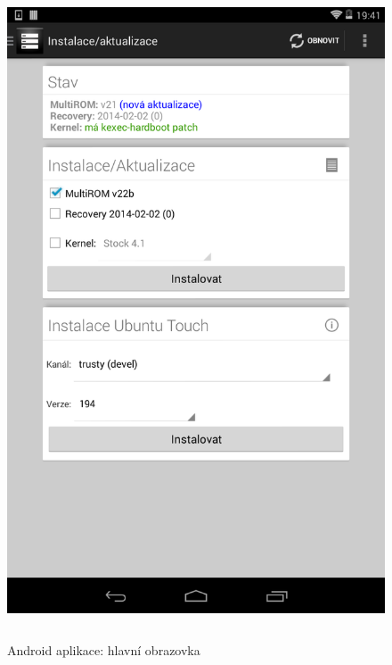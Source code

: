 \documentclass[12pt, a4paper, oneside]{article}
\begin{document}
\begin{figure}[H]
\begin{center}
 \includegraphics[height=550pt]{../img/app_main.png}
\caption{Android aplikace: hlavní obrazovka}
\end{center}
\end{figure}
\end{document}
